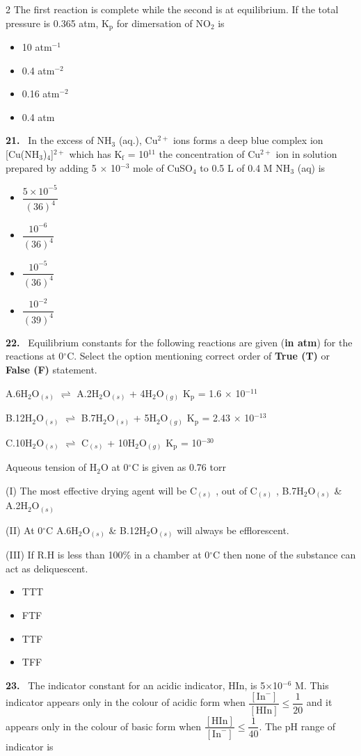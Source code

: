 \documentclass[10pt]{extarticle}
\newcommand{\qn}[1]{\par\smallskip\noindent\textbf{#1.}~}
\newenvironment{qoptions}{\begin{itemize}[leftmargin=1.8em,itemsep=1pt,topsep=2pt,label={}]}{\end{itemize}}
\newcommand{\opt}[2]{\item[(#1)] #2}
\begin{document}
\begin{multicols}{2}
The first reaction is complete while the second is at equilibrium. If the total pressure is 0.365 atm, K$_\mathrm p$ for dimersation of NO$_2$ is
\begin{qoptions}
\opt{A}{10 atm$^{-1}$}
\opt{B}{0.4 atm$^{-2}$}
\opt{C}{0.16 atm$^{-2}$}
\opt{D}{0.4 atm}
\end{qoptions}
\qn{21} In the excess of NH$_3$ (aq.), Cu$^{2+}$ ions forms a deep blue complex ion [Cu(NH$_3$)$_4$]$^{2+}$ which has K$_\mathrm f$ = 10$^{11}$ the concentration of Cu$^{2+}$ ion in solution prepared by adding 5 $\times$ 10$^{-3}$ mole of CuSO$_4$ to 0.5 L of 0.4 M NH$_3$ (aq) is
\begin{qoptions}
\opt{A}{$\dfrac{5\times10^{-5}}{(36)^4}$}
\opt{B}{$\dfrac{10^{-6}}{(36)^4}$}
\opt{C}{$\dfrac{10^{-5}}{(36)^4}$}
\opt{D}{$\dfrac{10^{-2}}{(39)^4}$}
\end{qoptions}
\qn{22} Equilibrium constants for the following reactions are given (\textbf{in atm}) for the reactions at 0$^\circ$C. Select the option mentioning correct order of \textbf{True (T)} or \textbf{False (F)} statement.\par
A.6H$_2$O$_{(s)}$ $\rightleftharpoons$ A.2H$_2$O$_{(s)}$ + 4H$_2$O$_{(g)}$ \hfill K$_\mathrm p$ = 1.6 $\times$ 10$^{-11}$\par
B.12H$_2$O$_{(s)}$ $\rightleftharpoons$ B.7H$_2$O$_{(s)}$ + 5H$_2$O$_{(g)}$ \hfill K$_\mathrm p$ = 2.43 $\times$ 10$^{-13}$\par
C.10H$_2$O$_{(s)}$ $\rightleftharpoons$ C$_{(s)}$ + 10H$_2$O$_{(g)}$ \hfill K$_\mathrm p$ = 10$^{-30}$\par
Aqueous tension of H$_2$O at 0$^\circ$C is given as 0.76 torr\par
(I) The most effective drying agent will be C$_{(s)}$ , out of C$_{(s)}$ , B.7H$_2$O$_{(s)}$ \& A.2H$_2$O$_{(s)}$\par
(II) At 0$^\circ$C A.6H$_2$O$_{(s)}$ \& B.12H$_2$O$_{(s)}$ will always be efflorescent.\par
(III) If R.H is less than 100\% in a chamber at 0$^\circ$C then none of the substance can act as deliquescent.
\begin{qoptions}
\opt{A}{TTT}
\opt{B}{FTF}
\opt{C}{TTF}
\opt{D}{TFF}
\end{qoptions}
\qn{23} The indicator constant for an acidic indicator, HIn, is 5$\times$10$^{-6}$ M. This indicator appears only in the colour of acidic form when $\dfrac{[\mathrm{In}^-]}{[\mathrm{HIn}]}\le\dfrac1{20}$ and it appears only in the colour of basic form when $\dfrac{[\mathrm{HIn}]}{[\mathrm{In}^-]}\le\dfrac1{40}$. The pH range of indicator is

\end{multicols}
\end{document}
